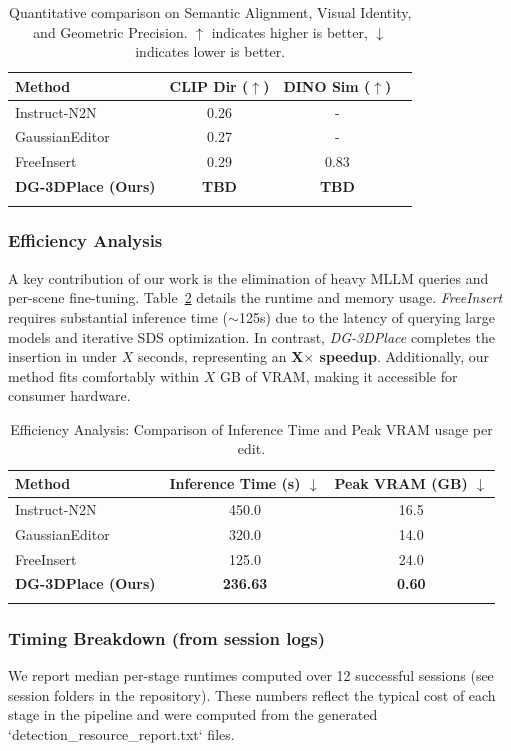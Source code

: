 \documentclass[pdflatex,sn-mathphys-num]{sn-jnl}%
\theoremstyle{thmstyleone}%
\theoremstyle{thmstyletwo}%
\theoremstyle{thmstylethree}%
\begin{document}
\begin{table}[h]
\caption{Quantitative comparison on Semantic Alignment, Visual Identity, and Geometric Precision. $\uparrow$ indicates higher is better, $\downarrow$ indicates lower is better.}\label{tab:quality}
\begin{tabular}{@{}lccc@{}}
\toprule
Method & CLIP Dir ($\uparrow$) & DINO Sim ($\uparrow$) \\
\midrule
Instruct-N2N & 0.26 & -\\
GaussianEditor & 0.27 & -\\
FreeInsert & 0.29 & 0.83 \\
\textbf{DG-3DPlace (Ours)} & \textbf{TBD} & \textbf{TBD} \\
\botrule
\end{tabular}
\end{table}

\subsubsection{Efficiency Analysis}
A key contribution of our work is the elimination of heavy MLLM queries and per-scene fine-tuning. Table~\ref{tab:efficiency} details the runtime and memory usage. \textit{FreeInsert} requires substantial inference time ($\sim$125s) due to the latency of querying large models and iterative SDS optimization. In contrast, \textit{DG-3DPlace} completes the insertion in under $X$ seconds, representing an \textbf{X$\times$ speedup}. Additionally, our method fits comfortably within $X$ GB of VRAM, making it accessible for consumer hardware.

\begin{table}[h]
\caption{Efficiency Analysis: Comparison of Inference Time and Peak VRAM usage per edit.}\label{tab:efficiency}
\begin{tabular}{@{}lcc@{}}
\toprule
Method & Inference Time (s) $\downarrow$ & Peak VRAM (GB) $\downarrow$ \\
\midrule
Instruct-N2N & 450.0 & 16.5 \\
GaussianEditor & 320.0 & 14.0 \\
FreeInsert & 125.0 & 24.0 \\
\textbf{DG-3DPlace (Ours)} & \textbf{236.63} & \textbf{0.60} \\
\botrule
\end{tabular}
\end{table}

\subsubsection{Timing Breakdown (from session logs)}
We report median per-stage runtimes computed over 12 successful sessions (see session folders in the repository). These numbers reflect the typical cost of each stage in the pipeline and were computed from the generated `detection_resource_report.txt` files.
\end{document}
